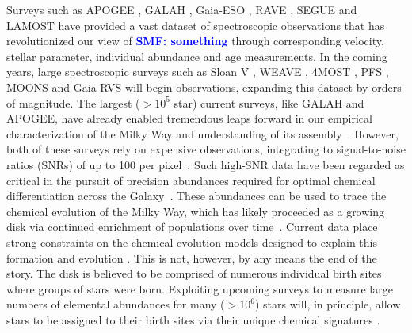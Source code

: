 \documentclass[a4paper,fleqn,usenatbib]{mnras}
\newcommand{\smf}[1]{\textbf{\textcolor{blue}{SMF: #1}}}
\begin{document}
Surveys such as APOGEE \citep{Majewski2017}, GALAH \citep{deSilva2015}, Gaia-ESO \citep{Gilmore2012}, RAVE \citep{Steinmetz2006}, SEGUE \citep{Yanny2009} and LAMOST \citep{Newberg2012} have provided a vast dataset of spectroscopic observations that has revolutionized our view of \smf{something} through corresponding velocity, stellar parameter, individual abundance and age measurements. In the coming years, large spectroscopic surveys such as Sloan V \citep{Kollmeier2017}, WEAVE \citep{Bonifacio2016}, 4MOST \citep{deJong2016}, PFS \citep{PFS2016}, MOONS \citep{C2014} and Gaia RVS \citep{Gaia2016} will begin observations, expanding this dataset by orders of magnitude. The largest ($> 10^5$ star) current surveys, like GALAH and APOGEE, have already enabled tremendous leaps forward in our empirical characterization of the Milky Way and understanding of its assembly~\citep{citations}. However, both of these surveys rely on expensive observations, integrating to signal-to-noise ratios (SNRs) of up to 100 per pixel~\citep{citations}. Such high-SNR data have been regarded as critical in the pursuit of precision abundances required for optimal chemical differentiation across the Galaxy~\citep{citations}. These abundances can be used to trace the chemical evolution of the Milky Way, which has likely proceeded as a growing disk via continued enrichment of populations over time~\citep{citations}. Current data place strong constraints on the chemical evolution models designed to explain this formation and evolution \citep[e.g.][]{Clarke2019,Minchev2013,Minchev2014}. This is not, however, by any means the end of the story. The disk is believed to be comprised of numerous individual birth sites where groups of stars were born. Exploiting upcoming surveys to measure large numbers of elemental abundances for many ($> 10^6$) stars will, in principle, allow stars to be assigned to their birth sites via their unique chemical signatures \citep[e.g.][]{BH2010}. 
\end{document}
